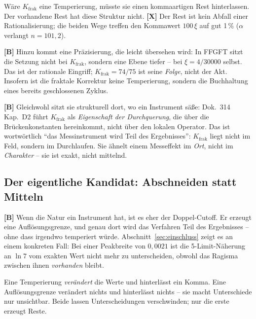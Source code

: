 \begin{keyresult}
W\"are $K_\text{frak}$ eine Temperierung, m\"usste sie einen
kommaartigen Rest hinterlassen. Der vorhandene Rest hat diese Struktur
nicht. \textbf{[X]} Der Rest ist kein Abfall einer Rationalisierung; die
beiden Wege treffen den Kommawert $100\,\xi$ auf gut 1\,\% ($\alpha$ verlangt $n = 101{,}2$).
\end{keyresult}

\textbf{[B]} Hinzu kommt eine Pr\"azisierung, die leicht \"ubersehen
wird: In FFGFT sitzt die Setzung nicht bei $K_\text{frak}$, sondern
eine Ebene tiefer -- bei $\xi = 4/30000$ selbst. Das ist der
rationale Eingriff; $K_\text{frak} = 74/75$ ist seine \emph{Folge},
nicht der Akt. Insofern ist die fraktale Korrektur keine Temperierung,
sondern die Buchhaltung eines bereits geschlossenen Zyklus.

\textbf{[B]} Gleichwohl sitzt sie strukturell dort, wo ein Instrument
s\"a\ss e: Dok.~314 Kap.~D2 f\"uhrt $K_\text{frak}$ als
\emph{Eigenschaft der Durchquerung}, die \"uber die Br\"ucken\-konstanten
hereinkommt, nicht \"uber den lokalen Operator. Das ist wortw\"ortlich
\enquote{das Messinstrument wird Teil des Ergebnisses}: $K_\text{frak}$
liegt nicht im Feld, sondern im Durchlaufen. Sie \"ahnelt einem
Messeffekt im \emph{Ort}, nicht im \emph{Charakter} -- sie ist exakt,
nicht mittelnd.

\subsection{Der eigentliche Kandidat: Abschneiden statt Mitteln}

\textbf{[B]} Wenn die Natur ein Instrument hat, ist es eher der
Doppel-Cutoff. Er erzeugt eine Aufl\"osungsgrenze, und genau dort wird
das Verfahren Teil des Ergebnisses -- ohne dass irgendwo temperiert
w\"urde. Abschnitt~\ref{sec:einschluss} zeigt es an einem konkreten
Fall: Bei einer Peakbreite von $0{,}0021$ ist die 5-Limit-N\"aherung an
$\ln 7$ vom exakten Wert nicht mehr zu unterscheiden, obwohl das
Ragisma zwischen ihnen \emph{vorhanden} bleibt.

\begin{highlight}
Eine Temperierung \emph{ver\"andert} die Werte und hinterl\"asst ein
Komma. Eine Aufl\"osungsgrenze ver\"andert nichts und hinterl\"asst
nichts -- sie macht Unterschiede nur unsichtbar. Beide lassen
Unterscheidungen verschwinden; nur die erste erzeugt Reste.
\end{highlight}

